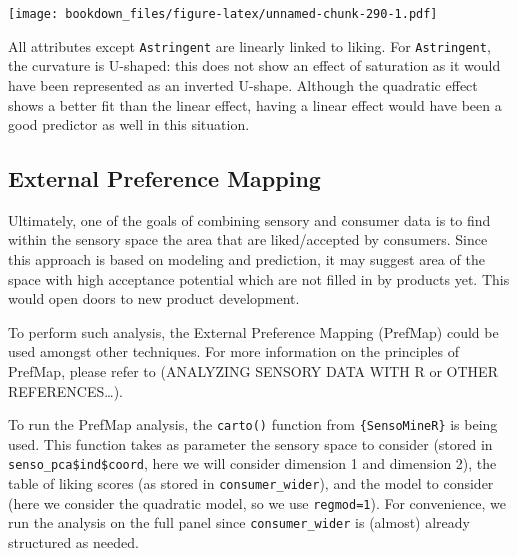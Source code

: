 \documentclass[
]{krantz}
\makeatletter
\newenvironment{Shaded}{\begin{snugshade}}{\end{snugshade}}
\newcommand{\AttributeTok}[1]{\textcolor[rgb]{0.61,0.61,0.61}{#1}}
\newcommand{\ConstantTok}[1]{\textcolor[rgb]{0,0,0}{#1}}
\newcommand{\ControlFlowTok}[1]{\textcolor[rgb]{0.27,0.27,0.27}{\textbf{#1}}}
\newcommand{\FunctionTok}[1]{\textcolor[rgb]{0,0,0}{#1}}
\newcommand{\NormalTok}[1]{#1}
\newcommand{\OtherTok}[1]{\textcolor[rgb]{0.37,0.37,0.37}{#1}}
\newcommand{\SpecialCharTok}[1]{\textcolor[rgb]{0,0,0}{#1}}
\newenvironment{kframe}{%
\medskip{}
\setlength{\fboxsep}{.8em}
 \def\at@end@of@kframe{}%
 \ifinner\ifhmode%
  \def\at@end@of@kframe{\end{minipage}}%
  \begin{minipage}{\columnwidth}%
 \fi\fi%
 \def\FrameCommand##1{\hskip\@totalleftmargin \hskip-\fboxsep
 \colorbox{shadecolor}{##1}\hskip-\fboxsep
     \hskip-\linewidth \hskip-\@totalleftmargin \hskip\columnwidth}%
 \MakeFramed {\advance\hsize-\width
   \@totalleftmargin\z@ \linewidth\hsize
   \@setminipage}}%
 {\par\unskip\endMakeFramed%
 \at@end@of@kframe}
\renewenvironment{Shaded}{\begin{kframe}}{\end{kframe}}
\makeatother
\begin{document}
\begin{Shaded}
\end{Shaded}

\texttt{[image: bookdown\_files/figure-latex/unnamed-chunk-290-1.pdf]}

All attributes except \texttt{Astringent} are linearly linked to liking. For \texttt{Astringent}, the curvature is U-shaped: this does not show an effect of saturation as it would have been represented as an inverted U-shape. Although the quadratic effect shows a better fit than the linear effect, having a linear effect would have been a good predictor as well in this situation.

\hypertarget{prefmap}{%
\subsection{External Preference Mapping}\label{prefmap}}

Ultimately, one of the goals of combining sensory and consumer data is to find within the sensory space the area that are liked/accepted by consumers. Since this approach is based on modeling and prediction, it may suggest area of the space with high acceptance potential which are not filled in by products yet. This would open doors to new product development.

To perform such analysis, the External Preference Mapping (PrefMap) could be used amongst other techniques. For more information on the principles of PrefMap, please refer to (ANALYZING SENSORY DATA WITH R or OTHER REFERENCES\ldots).

To run the PrefMap analysis, the \texttt{carto()} function from \texttt{\{SensoMineR\}} is being used. This function takes as parameter the sensory space to consider (stored in \texttt{senso\_pca\$ind\$coord}, here we will consider dimension 1 and dimension 2), the table of liking scores (as stored in \texttt{consumer\_wider}), and the model to consider (here we consider the quadratic model, so we use \texttt{regmod=1}). For convenience, we run the analysis on the full panel since \texttt{consumer\_wider} is (almost) already structured as needed.
\end{document}
